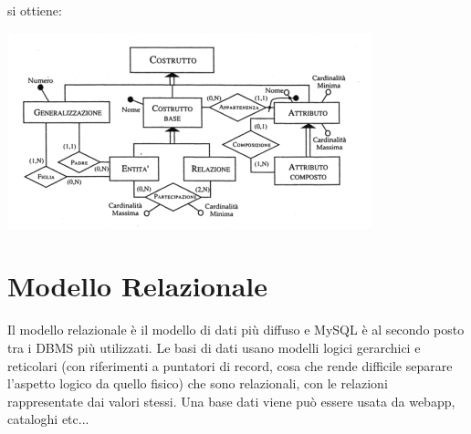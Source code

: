 \documentclass[a4paper,12pt, oneside]{book}
\begin{document}
si ottiene:
\begin{center}
\includegraphics[scale=0.8]{img/vin3.png}
\end{center}
\newpage
\section{Modello Relazionale}
Il modello relazionale è il modello di dati più diffuso e MySQL è al secondo posto tra i DBMS più utilizzati. Le basi di dati usano modelli logici gerarchici e reticolari (con riferimenti a puntatori di record, cosa che rende difficile separare l'aspetto logico da quello fisico) che sono relazionali, con le relazioni rappresentate dai valori stessi. Una base dati viene può essere usata da webapp, cataloghi etc... 
\end{document}
